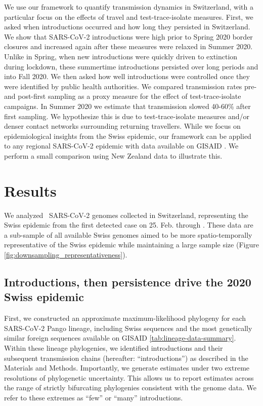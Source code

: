 \documentclass[9pt,twoside,lineno]{pnas-new} %
\begin{document}
We use our framework to quantify transmission dynamics in Switzerland, with a particular focus on the effects of travel and test-trace-isolate measures. First, we asked when introductions occurred and how long they persisted in Switzerland. We show that SARS-CoV-2 introductions were high prior to Spring 2020 border closures and increased again after these measures were relaxed in Summer 2020. Unlike in Spring, when new introductions were quickly driven to extinction during lockdown, these summertime introductions persisted over long periods and into Fall 2020. We then asked how well introductions were controlled once they were identified by public health authorities. We compared transmission rates pre- and post-first sampling as a proxy measure for the effect of test-trace-isolate campaigns. In Summer 2020 we estimate that transmission slowed 40-60\% after first sampling. We hypothesize this is due to test-trace-isolate measures and/or denser contact networks surrounding returning travellers. While we focus on epidemiological insights from the Swiss epidemic, our framework can be applied to any regional SARS-CoV-2 epidemic with data available on GISAID \cite{GISAID}. We perform a small comparison using New Zealand data to illustrate this. 

\section{Results}

We analyzed \nfocalsamples\ SARS-CoV-2 genomes collected in Switzerland, representing the Swiss epidemic from the first detected case on 25. Feb. through \maxdate. These data are a sub-sample of all available Swiss genomes aimed to be more spatio-temporally representative of the Swiss epidemic while maintaining a large sample size (Figure  \ref{fig:downsampling_representativeness}). 

\subsection{Introductions, then persistence drive the 2020 Swiss epidemic}

First, we constructed an approximate maximum-likelihood phylogeny for each SARS-CoV-2 Pango lineage, including Swiss sequences and the most genetically similar foreign sequences available on GISAID \ref{tab:lineage-data-summary}. Within these lineage phylogenies, we identified introductions and their subsequent transmission chains (hereafter: ``introductions'') as described in the Materials and Methods. Importantly, we generate estimates under two extreme resolutions of phylogenetic uncertainty. This allows us to report estimates across the range of strictly bifurcating phylogenies consistent with the genome data. We refer to these extremes as ``few'' or ``many'' introductions.
\end{document}
